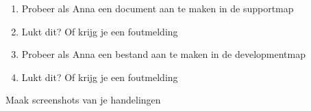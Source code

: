 \begin{enumerate}
\item Probeer als Anna een document aan te maken in de supportmap
\item Lukt dit? Of krijg je een foutmelding
\item Probeer als Anna een bestand aan te maken in de developmentmap
\item Lukt dit? Of krijg je een foutmelding
\end{enumerate}

Maak screenshots van je handelingen

